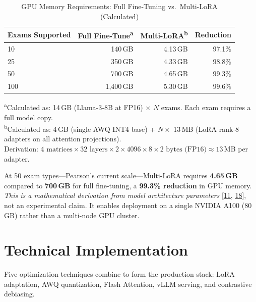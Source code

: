\documentclass[12pt]{article}
\begin{document}
\begin{table}[H]
\centering
\caption{GPU Memory Requirements: Full Fine-Tuning vs.\ Multi-LoRA (Calculated)}
\label{tab:memory}
\begin{tabular}{@{} l r r r @{}}
\toprule
\textbf{Exams Supported} & \textbf{Full Fine-Tune}\textsuperscript{a} & \textbf{Multi-LoRA}\textsuperscript{b} & \textbf{Reduction} \\
\midrule
10  & 140\,GB  & 4.13\,GB  & 97.1\% \\
25  & 350\,GB  & 4.33\,GB & 98.8\% \\
50  & 700\,GB  & 4.65\,GB  & 99.3\% \\
100 & 1,400\,GB & 5.30\,GB & 99.6\% \\
\bottomrule
\end{tabular}

\vspace{6pt}
{\footnotesize
\textsuperscript{a}Calculated as: 14\,GB (Llama-3-8B at FP16) $\times$ $N$ exams. Each exam requires a full model copy.\\
\textsuperscript{b}Calculated as: 4\,GB (single AWQ INT4 base) + $N \times$ 13\,MB (LoRA rank-8 adapters on all attention projections). \\
Derivation: $4 \text{ matrices} \times 32 \text{ layers} \times 2 \times 4096 \times 8 \times 2 \text{ bytes (FP16)} \approx 13$\,MB per adapter.
}
\end{table}

\begin{keyinsight}
\singlespacing
At 50 exam types---Pearson's current scale---Multi-LoRA requires \textbf{4.65\,GB} compared to \textbf{700\,GB} for full fine-tuning, a \textbf{99.3\% reduction} in GPU memory. \textit{This is a mathematical derivation from model architecture parameters} [\hyperlink{ref11}{11}, \hyperlink{ref18}{18}], not an experimental claim. It enables deployment on a single NVIDIA A100 (80\,GB) rather than a multi-node GPU cluster.
\end{keyinsight}

\section{Technical Implementation}

\begin{ataglance}
\singlespacing
Five optimization techniques combine to form the production stack: LoRA adaptation, AWQ quantization, Flash Attention, vLLM serving, and contrastive debiasing.
\end{ataglance}
\end{document}
